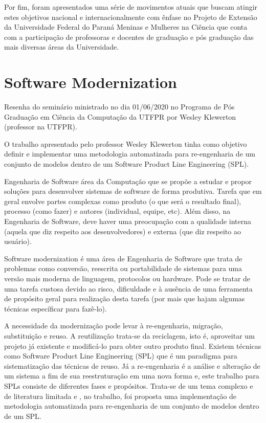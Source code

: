 \documentclass[
	12pt,				%
	openright,			%
	twoside,			%
	a4paper,			%
	english,			%
	brazil,				%
	svgnames
	]{abntex2}\usepackage[]{graphicx}\usepackage[]{color}
\begin{document}
Por fim, foram apresentados uma série de movimentos atuais que buscam atingir estes objetivos nacional e internacionalmente com ênfase no Projeto de Extensão da Universidade Federal do Paraná Meninas e Mulheres na Ciência que conta com a participação de professoras e docentes de graduação e pós graduação das mais diversas áreas da Universidade.

\chapter{Software Modernization}
\label{cap:res5}


Resenha do seminário ministrado no dia 01/06/2020 no Programa de Pós Graduação em Ciência da Computação da UTFPR por Wesley Klewerton (professor na UTFPR).

O trabalho apresentado pelo professor Wesley Klewerton tinha como objetivo definir e implementar uma metodologia automatizada para re-engenharia de um conjunto de modelos dentro de um Software Product Line Engineering (SPL).

Engenharia de Software área da Computação que se propõe a estudar e propor soluções para desenvolver sistemas de software de forma produtiva. Tarefa que em geral envolve partes complexas como produto (o que será o resultado final), processo (como fazer) e autores (individual, equipe, etc). Além disso, na Engenharia de Software, deve haver uma preocupação com a qualidade interna (aquela que diz respeito aos desenvolvedores) e externa (que diz respeito ao usuário).

Software modernization é uma área de Engenharia de Software que trata de problemas como conversão, reescrita ou portabilidade de sistemas para uma versão mais moderna de linguagem, protocolos ou hardware. Pode se tratar de uma tarefa custosa devido ao risco, dificuldade e à ausência de uma ferramenta de propósito geral para realização desta tarefa (por mais que hajam algumas técnicas específicar para fazê-lo).

A necessidade da modernização pode levar à re-engenharia, migração, substituição e reuso. A reutilização trata-se da reciclagem, isto é, aproveitar um projeto já existente e modificá-lo para obter outro produto final. Existem técnicas como Software Product Line Engineering (SPL) que é um paradigma para sistematização das técnicas de reuso. Já a re-engenharia é a análise e alteração de um sistema a fim de sua reestruturação em uma nova forma e, este trabalho para SPLs consiste de diferentes fases e propósitos. Trata-se de um tema complexo e de literatura limitada e , no trabalho, foi proposta uma implementação de metodologia automatizada para re-engenharia de um conjunto de modelos dentro de um SPL.
\end{document}
